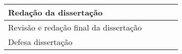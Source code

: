 \begin{tabular}{|l|ll|ll|}
    Redação da dissertação                                                                                                                            & \multicolumn{1}{l|}{}                     &                                    & \multicolumn{1}{l|}{\cellcolor{gray!150}} &                      \\ \hline
    Revisão e redação final da dissertação                                                                                                            & \multicolumn{1}{l|}{}                     &                                    & \multicolumn{1}{l|}{}                     & \cellcolor{gray!150} \\ \hline
    Defesa dissertação                                                                                                                                & \multicolumn{1}{l|}{}                     &                                    & \multicolumn{1}{l|}{}                     & \cellcolor{gray!150} \\ \hline
\end{tabular}
